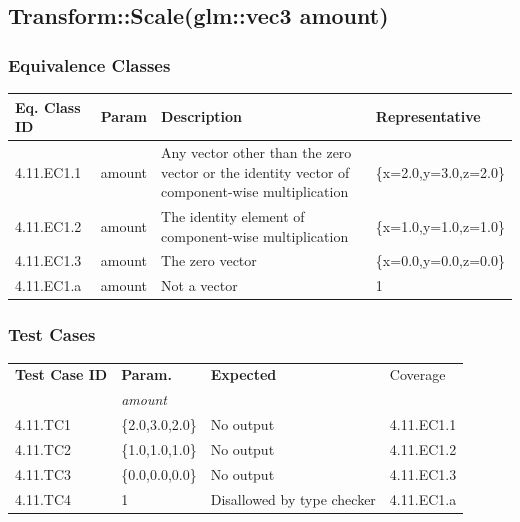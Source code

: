 \documentclass[11pt]{article}
\begin{document}
\clearpage
\subsection{Transform::Scale(glm::vec3 amount)}
\label{sec:orgf2eb590}

\subsubsection*{Equivalence Classes}
\label{sec:org216732f}
\begin{center}
\begin{tabularx}{\textwidth}{lXXX}
\hline
\textbf{Eq. Class ID} & \textbf{Param} & \textbf{Description} & \textbf{Representative}\\
\hline
4.11.EC1.1 & amount & Any vector other than the zero vector or the identity vector of component-wise multiplication & \{x=2.0,y=3.0,z=2.0\}\\
\hline
4.11.EC1.2 & amount & The identity element of component-wise multiplication & \{x=1.0,y=1.0,z=1.0\}\\
\hline
4.11.EC1.3 & amount & The zero vector & \{x=0.0,y=0.0,z=0.0\}\\
\hline
4.11.EC1.a & amount & Not a vector & 1\\
\hline
\end{tabularx}
\end{center}
\subsubsection*{Test Cases}
\label{sec:org9f8d897}
\begin{center}
\begin{tabularx}{\textwidth}{lXXX}
\hline
\textbf{Test Case ID} & \textbf{Param.} & \textbf{Expected} & Coverage\\
 & \textit{amount} &  & \\
\hline
4.11.TC1 & \{2.0,3.0,2.0\} & No output & 4.11.EC1.1\\
\hline
4.11.TC2 & \{1.0,1.0,1.0\} & No output & 4.11.EC1.2\\
\hline
4.11.TC3 & \{0.0,0.0,0.0\} & No output & 4.11.EC1.3\\
\hline
4.11.TC4 & 1 & Disallowed by type checker & 4.11.EC1.a\\
\hline
\end{tabularx}
\end{center}
\end{document}
